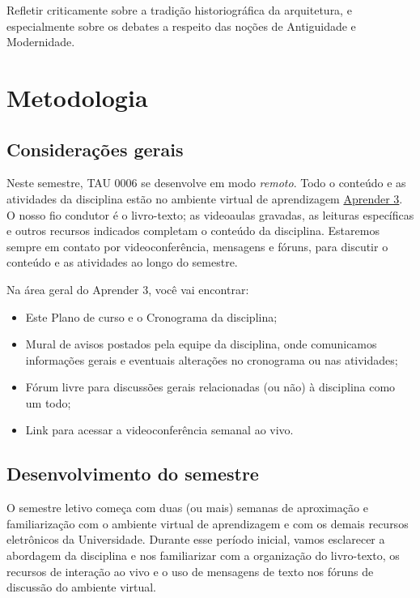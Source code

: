 \documentclass[
  11pt,
  brazil,
  a4paper,
]{article}
\providecommand{\tightlist}{%
  \setlength{\itemsep}{0pt}\setlength{\parskip}{0pt}}
\begin{document}
Refletir criticamente sobre a tradição historiográfica da arquitetura, e
especialmente sobre os debates a respeito das noções de Antiguidade e
Modernidade.

\hypertarget{metodologia}{%
\section{Metodologia}\label{metodologia}}

\hypertarget{considerauxe7uxf5es-gerais}{%
\subsection{Considerações gerais}\label{considerauxe7uxf5es-gerais}}

Neste semestre, TAU 0006 se desenvolve em modo \emph{remoto}. Todo o
conteúdo e as atividades da disciplina estão no ambiente virtual de
aprendizagem
\href{https://aprender3.unb.br/course/view.php?id=2766}{Aprender 3}. O
nosso fio condutor é o livro-texto; as videoaulas gravadas, as leituras
específicas e outros recursos indicados completam o conteúdo da
disciplina. Estaremos sempre em contato por videoconferência, mensagens
e fóruns, para discutir o conteúdo e as atividades ao longo do semestre.

Na área geral do Aprender 3, você vai encontrar:

\begin{itemize}
\tightlist
\item
  Este Plano de curso e o Cronograma da disciplina;
\item
  Mural de avisos postados pela equipe da disciplina, onde comunicamos
  informações gerais e eventuais alterações no cronograma ou nas
  atividades;
\item
  Fórum livre para discussões gerais relacionadas (ou não) à disciplina
  como um todo;
\item
  Link para acessar a videoconferência semanal ao vivo.
\end{itemize}

\hypertarget{desenvolvimento-do-semestre}{%
\subsection{Desenvolvimento do
semestre}\label{desenvolvimento-do-semestre}}

O semestre letivo começa com duas (ou mais) semanas de aproximação e
familiarização com o ambiente virtual de aprendizagem e com os demais
recursos eletrônicos da Universidade. Durante esse período inicial,
vamos esclarecer a abordagem da disciplina e nos familiarizar com a
organização do livro-texto, os recursos de interação ao vivo e o uso de
mensagens de texto nos fóruns de discussão do ambiente virtual.
\end{document}
